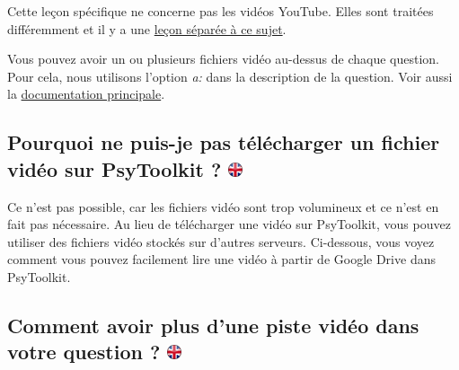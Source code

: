 \documentclass[
]{book}
\begin{document}
Cette leçon spécifique ne concerne pas les vidéos YouTube. Elles sont traitées différemment et il y a une \href{https://www.psytoolkit.org/lessons/youtube_video.html}{leçon séparée à ce sujet}.

Vous pouvez avoir un ou plusieurs fichiers vidéo au-dessus de chaque question. Pour cela, nous utilisons l'option \emph{a:} dans la description de la question. Voir aussi la \protect\hyperlink{s8}{documentation principale}.

\hypertarget{pourquoi-ne-puis-je-pas-tuxe9luxe9charger-un-fichier-viduxe9o-sur-psytoolkit}{%
\subsection[Pourquoi ne puis-je pas télécharger un fichier vidéo sur PsyToolkit ? ]{\texorpdfstring{Pourquoi ne puis-je pas télécharger un fichier vidéo sur PsyToolkit ? \href{https://www.psytoolkit.org/lessons/surveyaudiovideo.html\#_why_can_i_not_upload_a_video_file_to_psytoolkit}{\protect\includegraphics{img/ukflag.png}}}{Pourquoi ne puis-je pas télécharger un fichier vidéo sur PsyToolkit ? }}\label{pourquoi-ne-puis-je-pas-tuxe9luxe9charger-un-fichier-viduxe9o-sur-psytoolkit}}

Ce n'est pas possible, car les fichiers vidéo sont trop volumineux et ce n'est en fait pas nécessaire. Au lieu de télécharger une vidéo sur PsyToolkit, vous pouvez utiliser des fichiers vidéo stockés sur d'autres serveurs. Ci-dessous, vous voyez comment vous pouvez facilement lire une vidéo à partir de Google Drive dans PsyToolkit.

\hypertarget{comment-avoir-plus-dune-piste-viduxe9o-dans-votre-question}{%
\subsection[Comment avoir plus d'une piste vidéo dans votre question ? ]{\texorpdfstring{Comment avoir plus d'une piste vidéo dans votre question ? \href{https://www.psytoolkit.org/lessons/surveyaudiovideo.html\#_how_to_have_more_than_one_audio_track_in_your_question}{\protect\includegraphics{img/ukflag.png}}}{Comment avoir plus d'une piste vidéo dans votre question ? }}\label{comment-avoir-plus-dune-piste-viduxe9o-dans-votre-question}}
\end{document}
